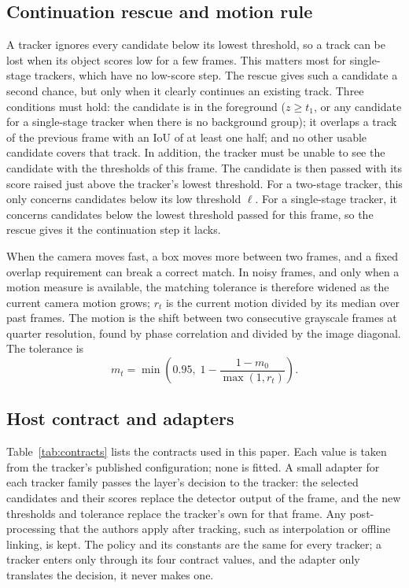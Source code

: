 \documentclass[pdflatex,sn-mathphys-num,iicol]{sn-jnl}
\begin{document}
\subsection{Continuation rescue and motion rule}\label{sec:rescue}
A tracker ignores every candidate below its lowest threshold, so a track
can be lost when its object scores low for a few frames. This matters most
for single-stage trackers, which have no low-score step. The rescue gives
such a candidate a second chance, but only when it clearly continues an
existing track. Three conditions must hold: the candidate is in the
foreground ($z\ge t_1$, or any candidate for a single-stage tracker when
there is no background group); it overlaps a track of the previous frame
with an IoU of at least one half; and no other usable candidate covers that
track. In addition, the tracker must be unable to see the candidate with the
thresholds of this frame. The candidate is then passed with its score raised just above
the tracker's lowest threshold. For a two-stage tracker, this only concerns
candidates below its low threshold $\ell$. For a single-stage tracker, it
concerns candidates below the lowest threshold passed for this frame, so the rescue gives it the
continuation step it lacks.

When the camera moves fast, a box moves more between two frames, and a
fixed overlap requirement can break a correct match. In noisy frames, and
only when a motion measure is available, the matching tolerance is
therefore widened as the current camera motion grows; $r_t$ is the current
motion divided by its median over past frames. The motion is the shift between two
consecutive grayscale frames at quarter resolution, found by phase
correlation \cite{reddy1996phasecorr} and divided by the image diagonal.
The tolerance is
\begin{equation}
m_t=\min\!\left(0.95,\;1-\frac{1-m_0}{\max(1,r_t)}\right).
\label{eq:motion}
\end{equation}

\subsection{Host contract and adapters}\label{sec:contract}
Table~\ref{tab:contracts} lists the contracts used in this paper. Each
value is taken from the tracker's published configuration; none is fitted.
A small adapter for each tracker family passes the layer's decision to the
tracker: the selected candidates and their scores replace the detector
output of the frame, and the new thresholds and tolerance replace the
tracker's own for that frame. Any post-processing that the authors apply
after tracking, such as interpolation or offline linking, is kept. The
policy and its constants are the same for every tracker; a tracker enters
only through its four contract values, and the adapter only translates the
decision, it never makes one.
\end{document}
